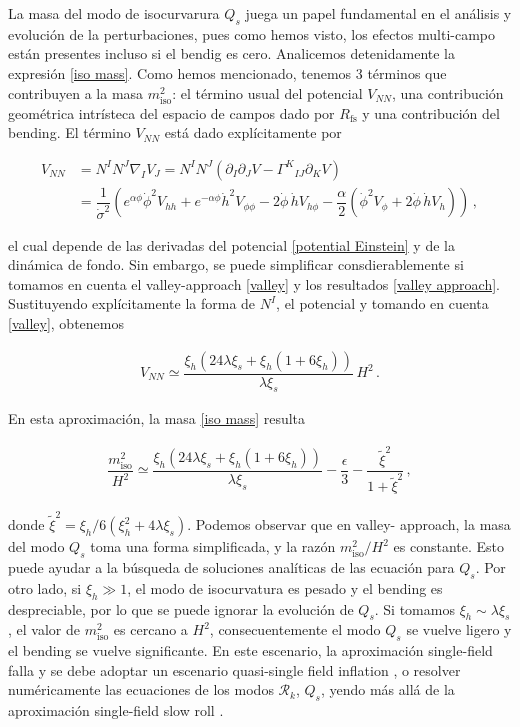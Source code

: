 \documentclass[12pt,a4paper,english,nofootinbib]{revtex4}
\newcommand{\beq}{\begin{eqnarray}}
\newcommand{\enq}{\end{eqnarray}}
\begin{document}
La masa del modo de isocurvarura $Q_s$ juega un papel fundamental en el análisis y evolución de la perturbaciones, pues como hemos visto, los efectos multi-campo están presentes incluso si el bendig es cero. Analicemos detenidamente la expresión \eqref{iso mass}. Como hemos mencionado, tenemos 3 términos que contribuyen a la masa $m_\text{iso}^2$: el término usual del potencial $V_{NN}$, una contribución geométrica intrísteca del espacio de campos dado por $R_\text{fs}$ y una contribución del bending. El término $V_{NN}$ está dado explícitamente por \cite{He2018}

\begin{align}
   \nonumber V_{NN} &= N^I N^J \nabla_I V_J = N^I N^J(\partial_I \partial_J V - \Gamma^K{}_{IJ}\partial_K V) \\[0.3cm]
     &= \dfrac{1}{\dot{\sigma}^2}\left(e^{\alpha\phi}\dot{\phi}^2 V_{hh} + e^{-\alpha \phi}\dot{h}^2 V_{\phi\phi} - 2\dot{\phi}\,\dot{h}V_{h\phi} - \dfrac{\alpha}{2}(\dot{\phi}^2 V_\phi + 2\dot{\phi}\,\dot{h}V_h ) \right)\,,
    \label{usual mass term}
\end{align}


el cual depende de las derivadas del potencial \eqref{potential Einstein} y de la dinámica de fondo. Sin embargo, se puede simplificar consdierablemente si tomamos en cuenta el valley-approach \eqref{valley} y los resultados \eqref{valley approach}. Sustituyendo explícitamente la forma de $N^I$, el potencial y tomando en cuenta \eqref{valley}, obtenemos

\beq
    V_{NN} \simeq \dfrac{\xi_h(24\lambda\xi_s + \xi_h(1 + 6\xi_h))}{\lambda\xi_s}\,H^2\,.
\enq 


En esta aproximación, la masa \eqref{iso mass} resulta 

\beq
    \dfrac{m_\text{iso}^2}{H^2} \simeq \dfrac{\xi_h(24\lambda\xi_s + \xi_h(1 + 6\xi_h))}{\lambda\xi_s} -\dfrac{\epsilon}{3} - \dfrac{\tilde{\xi}^2}{1 + \tilde{\xi}^2}\,,
\enq

donde $\tilde{\xi}^2 = \xi_h/6(\xi_h^2 + 4\lambda\xi_s)$. Podemos observar que en valley- approach, la masa del modo $Q_s$ toma una forma simplificada, y la razón $m_\text{iso}^2/H^2$ es constante. Esto puede ayudar a la búsqueda de soluciones analíticas de las ecuación para $Q_s$. Por otro lado, si $\xi_h \gg 1$, el modo de isocurvatura es pesado y el bending es despreciable, por lo que se puede ignorar la evolución de $Q_s$. Si tomamos $\xi_h \sim \lambda\xi_s$, el valor de $m_\text{iso}^2 $ es cercano a $H^2$, consecuentemente el modo $Q_s$ se vuelve ligero y el bending se vuelve significante. En este escenario, la aproximación single-field falla y se debe adoptar un escenario quasi-single field inflation \cite{Chen_2010,chen2010prd}, o resolver numéricamente las ecuaciones de los modos $\mathcal{R}_k$, $Q_s$, yendo más allá de la aproximación single-field slow roll \cite{Wang2017}.
\end{document}
